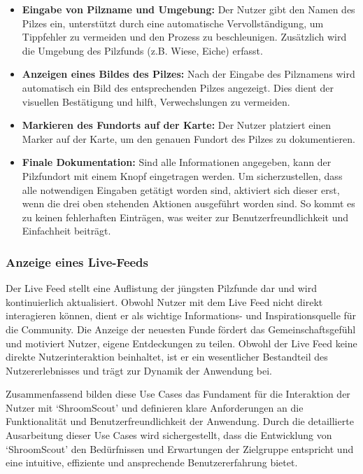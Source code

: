 \documentclass[../main.tex]{subfiles} %
\begin{document}
\begin{itemize}

	\item \textbf{Eingabe von Pilzname und Umgebung:}
	      Der Nutzer gibt den Namen des Pilzes ein, unterstützt durch eine automatische Vervollständigung, um Tippfehler zu
	      vermeiden und den Prozess zu beschleunigen. Zusätzlich wird die Umgebung des Pilzfunds (z.B. Wiese, Eiche) erfasst.

	\item \textbf{Anzeigen eines Bildes des Pilzes:}
	      Nach der Eingabe des Pilznamens wird automatisch ein Bild des entsprechenden Pilzes angezeigt. Dies dient der visuellen
	      Bestätigung und hilft, Verwechslungen zu vermeiden.

	\item \textbf{Markieren des Fundorts auf der Karte:}
	      Der Nutzer platziert einen Marker auf der Karte, um den genauen Fundort des Pilzes zu dokumentieren.

	\item \textbf{Finale Dokumentation:}
	      Sind alle Informationen angegeben, kann der Pilzfundort mit einem Knopf eingetragen werden. Um sicherzustellen, dass alle
	      notwendigen Eingaben getätigt worden sind, aktiviert sich dieser erst, wenn die drei oben stehenden Aktionen ausgeführt
	      worden sind. So kommt es zu keinen fehlerhaften Einträgen, was weiter zur Benutzerfreundlichkeit und Einfachheit beiträgt.

\end{itemize}

\subsubsection{Anzeige eines Live-Feeds}

Der Live Feed stellt eine Auflistung der jüngsten Pilzfunde dar und wird kontinuierlich aktualisiert. Obwohl Nutzer mit dem
Live Feed nicht direkt interagieren können, dient er als wichtige Informations- und Inspirationsquelle für die Community.
Die Anzeige der neuesten Funde fördert das Gemeinschaftsgefühl und motiviert Nutzer, eigene Entdeckungen zu teilen. Obwohl der
Live Feed keine direkte Nutzerinteraktion beinhaltet, ist er ein wesentlicher Bestandteil des Nutzererlebnisses und trägt zur
Dynamik der Anwendung bei.

Zusammenfassend bilden diese Use Cases das Fundament für die Interaktion der Nutzer mit `ShroomScout' und definieren klare
Anforderungen an die Funktionalität und Benutzerfreundlichkeit der Anwendung. Durch die detaillierte Ausarbeitung dieser Use
Cases wird sichergestellt, dass die Entwicklung von `ShroomScout' den Bedürfnissen und Erwartungen der Zielgruppe entspricht
und eine intuitive, effiziente und ansprechende Benutzererfahrung bietet.
\end{document}
